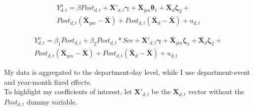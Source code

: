 \documentclass[11pt,a4paper]{article}
\begin{document}
\begin{equation}
	\begin{split}
		Y^{o}_{d,t} = \beta Post_{d,t} + \boldsymbol{X'}_{d,t} \boldsymbol{\gamma} + \boldsymbol{\bar{X}}_{ym} \boldsymbol{\theta}_1 + \boldsymbol{\bar{X}}_{d} \boldsymbol{\zeta}_2 + \\ Post_{d,t} (\boldsymbol{\bar{X}}_{ym} - \boldsymbol{\bar{X}}) + Post_{d,t} (\boldsymbol{\bar{X}}_{d} - \boldsymbol{\bar{X}}) + u_{d,t} 
	\label{eq5_TWM_DiD}
	\end{split}
\end{equation}

\begin{equation} 
	\begin{split}
		Y^{o}_{d,t} = \beta_1 Post_{d,t} + \beta_2 Post_{d,t}*Scr + \boldsymbol{X'}_{d,t} \boldsymbol{\gamma} + \boldsymbol{\bar{X}}_{ym} \boldsymbol{\zeta}_1 + \boldsymbol{\bar{X}}_{d} \boldsymbol{\zeta}_2+ \\ Post_{d,t} (\boldsymbol{\bar{X}}_{ym} - \boldsymbol{\bar{X}}) + Post_{d,t} (\boldsymbol{\bar{X}}_{d} - \boldsymbol{\bar{X}}) + u_{d,t} 
	\label{eq6_TWM_DiDiD}
	\end{split}
\end{equation}

My data is aggregated to the department-day level, while I use department-event and year-month fixed effects. \\

To highlight my coefficients of interest, let $\boldsymbol{X'}_{d,t}$ be the $\boldsymbol{X}_{d,t}$ vector without the $Post_{d,t}$ dummy variable.  



\newpage 
\begin{center}

\end{center}

\begin{center}

\end{center}



\newpage 
\begin{center}

\end{center}

\begin{center}

\end{center}
\end{document}
